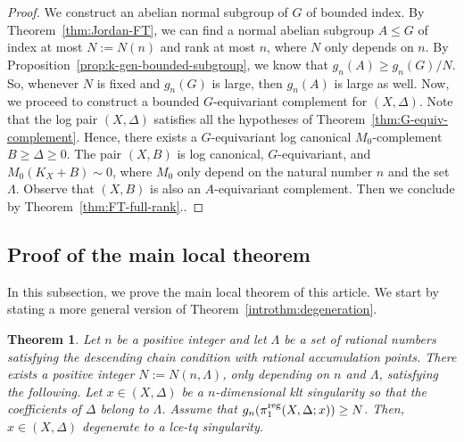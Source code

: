 \documentclass{amsart}
\newtheorem{theorem}{Theorem}[section]
\theoremstyle{remark}
\numberwithin{equation}{section}
\begin{document}
\begin{proof}
We construct an abelian normal subgroup of $G$ of bounded index.
By Theorem~\ref{thm:Jordan-FT}, we can find a normal abelian subgroup $A\leqslant G$ of index at most $N:=N(n)$ and rank at most $n$, where $N$ only depends on $n$.
By Proposition~\ref{prop:k-gen-bounded-subgroup}, we know that $g_n(A)\geq g_n(G)/N$.
So, whenever $N$ is fixed and $g_n(G)$ is large, then $g_n(A)$ is large as well.
Now, we proceed to construct a bounded $G$-equivariant complement for $(X,\Delta)$.
Note that the log pair $(X,\Delta)$ satisfies all the hypotheses of Theorem~\ref{thm:G-equiv-complement}.
Hence, there exists a $G$-equivariant log canonical $M_0$-complement $B\geq \Delta\geq 0$.
The pair $(X,B)$ is log canonical, $G$-equivariant, and $M_0(K_X+B)\sim 0$,
where $M_0$ only depend on the natural number $n$ and the set $\Lambda$.
Observe that $(X,B)$ is also an $A$-equivariant complement.
Then we conclude by Theorem~\ref{thm:FT-full-rank}..
\end{proof}

\subsection{Proof of the main local theorem} 
In this subsection, we prove the main local theorem of this article.
We start by stating a more general version of Theorem~\ref{introthm:degeneration}.

\begin{theorem}\label{thm:regional-general}
Let $n$ be a positive integer
and let $\Lambda$ be a set of rational numbers satisfying the descending chain condition with rational accumulation points.
There exists a positive integer $N:=N(n,\Lambda)$,
only depending on $n$ and $\Lambda$,
satisfying the following.
Let $x\in (X,\Delta)$ be a $n$-dimensional klt singularity
so that the coefficients of $\Delta$ belong to $\Lambda$.
Assume that 
$g_n(\pi_1^{\rm reg}(X,\Delta;x))\geq N$.
Then, $x\in (X,\Delta)$ degenerate to a lce-tq singularity.
\end{theorem}
\end{document}

